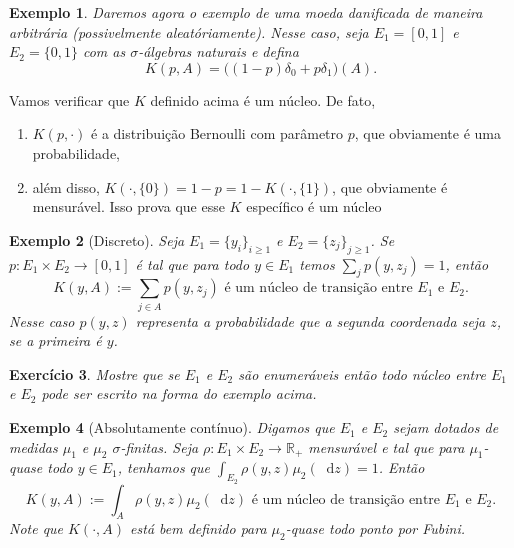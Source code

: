\documentclass[reqno, draft]{book}
\newcommand*\1{\mathds{1}}
\newtheorem{example}{Exemplo}[section]
\newtheorem{exercise}[example]{Exercício}
\renewcommand*\d{\mathop{}\!\mathrm{d}}
\begin{document}
\begin{example}
  \label{x:moeda_danificada}
  Daremos agora o exemplo de uma moeda danificada de maneira arbitrária (possivelmente aleatóriamente).
  Nesse caso, seja $E_1 = [0,1]$ e $E_2 = \{0,1\}$ com as $\sigma$-álgebras naturais e defina
  \begin{equation}
    K(p, A) = \big( (1-p)\delta_0 + p \delta_1 \big) (A).
  \end{equation}
\end{example}

Vamos verificar que $K$ definido acima é um núcleo.
De fato,
\begin{enumerate}[\quad i)]
\item $K(p, \cdot)$ é a distribuição Bernoulli com parâmetro $p$, que obviamente é uma probabilidade,
\item além disso, $K(\cdot, \{0\}) = 1-p = 1 - K(\cdot,\{1\})$, que obviamente é mensurável.
Isso prova que esse $K$ específico é um núcleo
\end{enumerate}

\begin{example}[Discreto]
  \label{x:nucleo_discreto}
  Seja $E_1 = \{y_i\}_{i \geq 1}$ e $E_2 = \{z_j\}_{j \geq 1}$.
  Se $p: E_1 \times E_2 \to [0,1]$ é tal que para todo $y \in E_1$ temos $\sum_{j} p(y, z_j) = 1$, então
  \begin{equation}
    K(y, A) := \sum_{j \in A} p(y, z_j) \text{ é um núcleo de transição entre $E_1$ e $E_2$.}
  \end{equation}
  Nesse caso $p(y,z)$ representa a probabilidade que a segunda coordenada seja $z$, se a primeira é $y$.
\end{example}

\begin{exercise}
  Mostre que se $E_1$ e $E_2$ são enumeráveis então todo núcleo entre $E_1$ e $E_2$ pode ser escrito na forma do exemplo acima.
\end{exercise}

\begin{example}[Absolutamente contínuo]
  Digamos que $E_1$ e $E_2$ sejam dotados de medidas $\mu_1$ e $\mu_2$ $\sigma$-finitas.
  Seja $\rho: E_1 \times E_2 \to \mathbb{R}_+$ mensurável e tal que para $\mu_1$-quase todo $y \in E_1$, tenhamos que $\int_{E_2} \rho(y, z) \mu_2(\d z) = 1$.
  Então
  \begin{equation}
    K(y, A) := \int_A \rho(y, z) \mu_2(\d z) \text{ é um núcleo de transição entre $E_1$ e $E_2$.}
  \end{equation}
  Note que $K(\cdot, A)$ está bem definido para $\mu_2$-quase todo ponto por Fubini.
\end{example}
\end{document}
